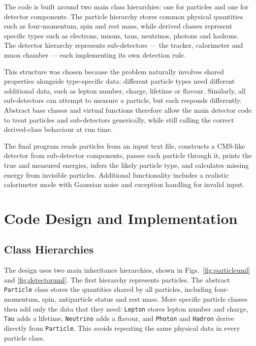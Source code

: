 \documentclass[11pt,a4paper]{article}
\begin{document}
The code is built around two main class hierarchies: one for particles and one for detector components. The particle hierarchy stores common physical quantities such as four-momentum, spin and rest mass, while derived classes represent specific types such as electrons, muons, taus, neutrinos, photons and hadrons. The detector hierarchy represents sub-detectors --- the tracker, calorimeter and muon chamber --- each implementing its own detection rule.

This structure was chosen because the problem naturally involves shared properties alongside type-specific data: different particle types need different additional data, such as lepton number, charge, lifetime or flavour. Similarly, all sub-detectors can attempt to measure a particle, but each responds differently. Abstract base classes and virtual functions therefore allow the main detector code to treat particles and sub-detectors generically, while still calling the correct derived-class behaviour at run time.

The final program reads particles from an input text file, constructs a CMS-like detector from sub-detector components, passes each particle through it, prints the true and measured energies, infers the likely particle type, and calculates missing energy from invisible particles. Additional functionality includes a realistic calorimeter mode with Gaussian noise and exception handling for invalid input.


\section{Code Design and Implementation}

\subsection{Class Hierarchies}

The design uses two main inheritance hierarchies, shown in Figs.~\ref{fig:particleuml} and \ref{fig:detectoruml}. The first hierarchy represents particles. The abstract \texttt{Particle} class stores the quantities shared by all particles, including four-momentum, spin, antiparticle status and rest mass. More specific particle classes then add only the data that they need: \texttt{Lepton} stores lepton number and charge, \texttt{Tau} adds a lifetime, \texttt{Neutrino} adds a flavour, and \texttt{Photon} and \texttt{Hadron} derive directly from \texttt{Particle}. This avoids repeating the same physical data in every particle class.
\end{document}
